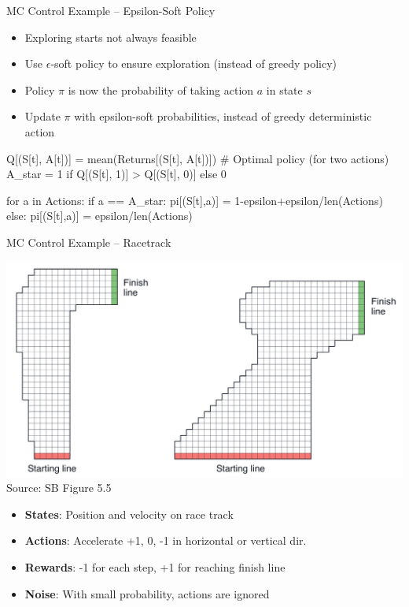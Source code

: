 \documentclass[ignorenonframetext,xcolor=x11names]{beamer}
\begin{document}
\begin{frame}[fragile]{MC Control Example -- Epsilon-Soft Policy}
\begin{itemize}
\item Exploring starts not always feasible
\item Use $\epsilon$-soft policy to ensure exploration (instead of greedy policy)
\item Policy $\pi$ is now the probability of taking action $a$ in state $s$
\item Update $\pi$ with epsilon-soft probabilities, instead of greedy deterministic action
\end{itemize}

\begin{pythoncode}
Q[(S[t], A[t])] = mean(Returns[(S[t], A[t])])
# Optimal policy (for two actions)
A_star = 1 if Q[(S[t], 1)] > Q[(S[t], 0)] else 0

for a in Actions:
    if a == A_star:
        pi[(S[t],a)] = 1-epsilon+epsilon/len(Actions)
    else:
        pi[(S[t],a)] = epsilon/len(Actions)
\end{pythoncode}
\end{frame}

\begin{frame}[fragile]{MC Control Example -- Racetrack}
\begin{center}
\includegraphics[width=.75\textwidth]{screen5.png} \\
\scriptsize Source: SB Figure 5.5 \normalsize
\end{center}
\begin{itemize}
   \item \textbf{States}: Position and velocity on race track
   \item \textbf{Actions}: Accelerate +1, 0, -1 in horizontal or vertical dir.
   \item \textbf{Rewards}: -1 for each step, +1 for reaching finish line
   \item \textbf{Noise}: With small probability, actions are ignored
\end{itemize}
\end{frame}
\end{document}
